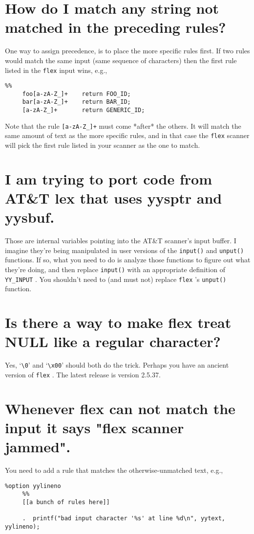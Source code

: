 \documentclass[openany,oneside]{book}
\begin{document}
\section{How do I match any string not matched in the preceding rules?}


One way to assign precedence, is to place the more specific rules first. If
two rules would match the same input (same sequence of characters) then the
first rule listed in the \verb`flex` input wins, e.g.,
\begin{verbatim}
%%
     foo[a-zA-Z_]+    return FOO_ID;
     bar[a-zA-Z_]+    return BAR_ID;
     [a-zA-Z_]+       return GENERIC_ID;
\end{verbatim}


Note that the rule \verb`[a-zA-Z_]+` must come *after* the others.  It will match the
same amount of text as the more specific rules, and in that case the \verb`flex` scanner will pick the first rule listed in your scanner as the
one to match.
\section{I am trying to port code from AT\&{}T lex that uses yysptr and yysbuf.}


Those are internal variables pointing into the AT\&{}T scanner's input buffer.  I
imagine they're being manipulated in user versions of the \verb`input()` and \verb`unput()` functions.  If so, what you need to do is analyze those functions to figure out
what they're doing, and then replace \verb`input()` with an appropriate definition of \verb`YY_INPUT` .  You shouldn't need to (and must not) replace \verb`flex` 's \verb`unput()` function.
\section{Is there a way to make flex treat NULL like a regular character?}


Yes, ‘\verb`\0`’ and ‘\verb`\x00`’ should both do the trick.  Perhaps you have an ancient
version of \verb`flex` .  The latest release is version 2.5.37.
\section{Whenever flex can not match the input it says "flex scanner jammed".}


You need to add a rule that matches the otherwise-unmatched text,
e.g.,
\begin{verbatim}
%option yylineno
     %%
     [[a bunch of rules here]]
     
     .	printf("bad input character '%s' at line %d\n", yytext, yylineno);
\end{verbatim}
\end{document}
